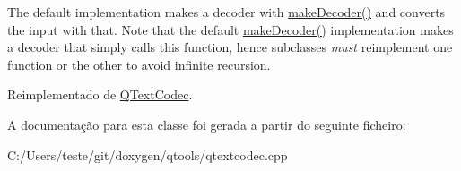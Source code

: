 The default implementation makes a decoder with \hyperlink{class_q_text_codec_ad7f6bd53bcbf64bf6f2e75106d229e19}{make\-Decoder()} and converts the input with that. Note that the default \hyperlink{class_q_text_codec_ad7f6bd53bcbf64bf6f2e75106d229e19}{make\-Decoder()} implementation makes a decoder that simply calls this function, hence subclasses {\itshape must} reimplement one function or the other to avoid infinite recursion. 

Reimplementado de \hyperlink{class_q_text_codec_a007974789d47a38acb95816cd5486c8c}{Q\-Text\-Codec}.



A documentação para esta classe foi gerada a partir do seguinte ficheiro\-:\begin{DoxyCompactItemize}
\item 
C\-:/\-Users/teste/git/doxygen/qtools/qtextcodec.\-cpp\end{DoxyCompactItemize}

